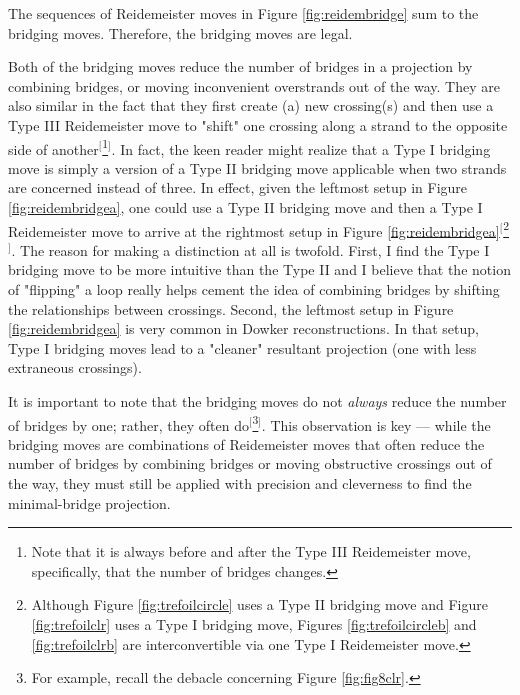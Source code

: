 \documentclass[titlepage]{article}
\begin{document}
The sequences of Reidemeister moves in Figure \ref{fig:reidembridge} sum to the bridging moves. Therefore, the bridging moves are legal.\par
Both of the bridging moves reduce the number of bridges in a projection by combining bridges, or moving inconvenient overstrands out of the way. They are also similar in the fact that they first create (a) new crossing(s) and then use a Type III Reidemeister move to "shift" one crossing along a strand to the opposite side of another$^[$\footnote{Note that it is always before and after the Type III Reidemeister move, specifically, that the number of bridges changes.}$^]$. In fact, the keen reader might realize that a Type I bridging move is simply a version of a Type II bridging move applicable when two strands are concerned instead of three. In effect, given the leftmost setup in Figure \ref{fig:reidembridgea}, one could use a Type II bridging move and then a Type I Reidemeister move to arrive at the rightmost setup in Figure \ref{fig:reidembridgea}$^[$\footnote{Although Figure \ref{fig:trefoilcircle} uses a Type II bridging move and Figure \ref{fig:trefoilclr} uses a Type I bridging move, Figures \ref{fig:trefoilcircleb} and \ref{fig:trefoilclrb} are interconvertible via one Type I Reidemeister move.}$^]$. The reason for making a distinction at all is twofold. First, I find the Type I bridging move to be more intuitive than the Type II and I believe that the notion of "flipping" a loop really helps cement the idea of combining bridges by shifting the relationships between crossings. Second, the leftmost setup in Figure \ref{fig:reidembridgea} is very common in Dowker reconstructions. In that setup, Type I bridging moves lead to a "cleaner" resultant projection (one with less extraneous crossings).\par
It is important to note that the bridging moves do not \emph{always} reduce the number of bridges by one; rather, they often do$^[$\footnote{For example, recall the debacle concerning Figure \ref{fig:fig8clr}.}$^]$. This observation is key --- while the bridging moves are combinations of Reidemeister moves that often reduce the number of bridges by combining bridges or moving obstructive crossings out of the way, they must still be applied with precision and cleverness to find the minimal-bridge projection.\par
\end{document}
